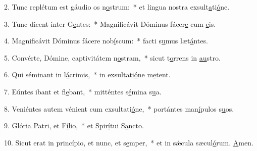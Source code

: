 2. Tunc replétum est gáudio os n\uline{o}strum:~* et lingua nostra exsult\uline{a}ti\uline{ó}ne.\par 
3. Tunc dicent inter G\uline{e}ntes:~* Magnificávit Dóminus fácer\uline{e} cum \uline{e}is.\par 
4. Magnificávit Dóminus fácere nob\uline{í}scum:~* facti s\uline{u}mus læt\uline{á}ntes.\par 
5. Convérte, Dómine, captivitátem n\uline{o}stram,~* sicut t\uline{o}rrens in \uline{au}stro.\par 
6. Qui séminant in l\uline{á}crimis,~* in exsultati\uline{ó}ne m\uline{e}tent.\par 
7. Eúntes ibant et fl\uline{e}bant,~* mitténtes s\uline{é}mina s\uline{u}a.\par 
8. Veniéntes autem vénient cum exsultati\uline{ó}ne,~* portántes man\uline{í}pulos s\uline{u}os.\par 
9. Glória Patri, et F\uline{í}lio,~* et Spir\uline{í}tui S\uline{a}ncto.\par 
10. Sicut erat in princípio, et nunc, et s\uline{e}mper,~* et in sǽcula sæcul\uline{ó}rum. \uline{A}men.\par 

